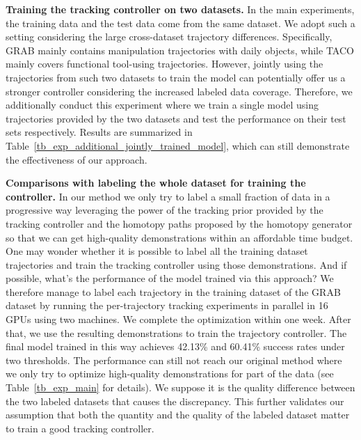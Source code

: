 \noindent\textbf{Training the tracking controller on two datasets.} In the main experiments, the training data and the test data come from the same dataset. We adopt such a setting considering the large cross-dataset trajectory differences. Specifically, GRAB mainly contains manipulation trajectories with daily objects, while TACO mainly covers functional tool-using trajectories. However, jointly using the trajectories from such two datasets to train the model can potentially offer us a stronger controller considering the increased labeled data coverage. Therefore, we additionally conduct this experiment where we train a single model using trajectories provided by the two datasets and test the performance on their test sets respectively. Results are summarized in Table~\ref{tb_exp_additional_jointly_trained_model}, which can still demonstrate the effectiveness of our approach. 


\noindent\textbf{Comparisons with labeling the whole dataset for training the controller. } In our method we only try to label a small fraction of data in a progressive way leveraging the power of the tracking prior provided by the tracking controller and the homotopy paths proposed by the homotopy generator so 
that we can get high-quality demonstrations within an affordable time budget. One may wonder whether it is possible to label all the training dataset trajectories and train the tracking controller using those demonstrations. And if possible, what's the performance of the model trained via this approach? We therefore manage to label each trajectory in the training dataset of the GRAB dataset by running the per-trajectory tracking experiments in parallel in 16 GPUs using two machines. 
We complete the optimization within one week. 
After that, we use the resulting demonstrations to train 
the trajectory controller. The final model trained in this way achieves 42.13\% and 60.41\% success rates under two thresholds. The performance can still not reach our original method where we only try to optimize high-quality demonstrations for part of the data (see Table~\ref{tb_exp_main} for details). We suppose it is the quality difference between the two labeled datasets that causes the discrepancy. This further validates our assumption that both the quantity and the quality of the labeled dataset matter to train a good tracking controller. 




